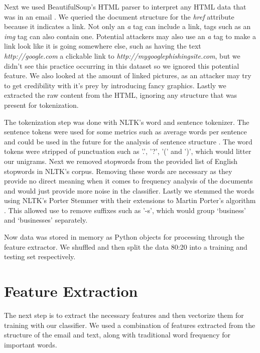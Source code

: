 \documentclass[12pt]{article}
\begin{document}
\begin{multicols}{2}
            Next we used BeautifulSoup's HTML parser to interpret any HTML data that
            was in an email \cite{beautiful_soup}. We queried the document structure for the \textit{href}
            attribute because it indicates a link. Not only an \textit{a} tag can include
            a link, tags such as an \textit{img} tag can also contain one. Potential attackers
            may also use an \textit{a} tag to make a link look like it is going somewhere else,
            such as having the text \textit{http://google.com} a clickable link to
            \textit{http://mygooglephishingsite.com}, but we didn't see this practice 
            occurring in this dataset so we ignored this potential feature. We also looked at the
            amount of linked pictures, as an attacker may try to get credibility with it's prey
            by introducing fancy graphics. Lastly we extracted the raw content from the HTML,
            ignoring any structure that was present for tokenization.


            The tokenization step was done with NLTK's word and sentence tokenizer.
            The sentence tokens were used for some metrics such as average words per
            sentence and could be used in the future for the analysis of sentence
            structure \cite{nltk}. The word tokens were stripped of punctuation such as '.',
            '?', '(' and ')', which would litter our unigrams. Next we removed stopwords
            from the provided list of English stopwords in NLTK's corpus. Removing
            these words are necessary as they provide no direct meaning when it comes
            to frequency analysis of the documents and would just provide more noise
            in the classifier. Lastly we
            stemmed the words using NLTK's Porter Stemmer with their extensions to
            Martin Porter's algorithm \cite{porter1980algorithm}. This allowed use to remove suffixes such as '-s',
            which would group `business' and `businesses' separately.


            Now data was stored in memory as Python objects for processing through the
            feature extractor. We shuffled and then split the data 
            80:20 into a training and testing set respectively.
        
        \section{Feature Extraction}

            The next step is to extract the necessary features and then vectorize
            them for training with our classifier. We used a combination of features
            extracted from the structure of the email and text, along with traditional
            word frequency for important words.
            

\end{multicols}
\end{document}
